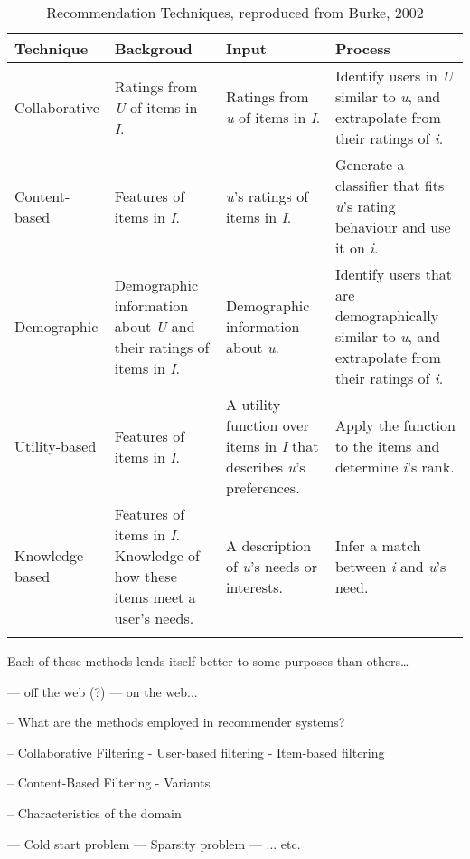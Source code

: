 \begin{table}[ht]
    \caption{Recommendation Techniques, reproduced from Burke, 2002 \cite{Burke02}}
    \centering
    \begin{tabular}{|p{2.5cm}|p{3.5cm}|p{3.5cm}|p{3.5cm}|}
        Technique & Backgroud & Input & Process
        \\\hline
        Collaborative & Ratings from \textit{U} of items in \textit{I}. & Ratings from \textit{u} of items in \textit{I}. & Identify users in \textit{U} similar to \textit{u}, and extrapolate from their ratings of \textit{i}. \\
        Content-based & Features of items in \textit{I}. & \textit{u}'s ratings of items in \textit{I}. & Generate a classifier that fits \textit{u}'s rating behaviour and use it on \textit{i}. \\ 
        Demographic & Demographic information about \textit{U} and their ratings of items in \textit{I}. & Demographic information about \textit{u}. & Identify users that are demographically similar to \textit{u}, and extrapolate from their ratings of \textit{i}. \\
        Utility-based & Features of items in \textit{I}. & A utility function over items in \textit{I} that describes \textit{u}'s preferences. & Apply the function to the items and determine \textit{i}'s rank. \\
        Knowledge-based & Features of items in \textit{I}. Knowledge of how these items meet a user's needs. & A description of \textit{u}'s needs or interests. & Infer a match between \textit{i} and \textit{u}'s need. \\
        \\\hline
    \end{tabular}
    \label{table:burke02}
\end{table}

Each of these methods lends itself better to some purposes than others\ldots






--- off the web (?)
--- on the web...

-- What are the methods employed in recommender systems?

-- Collaborative Filtering
  - User-based filtering
  - Item-based filtering

-- Content-Based Filtering
  - Variants

-- Characteristics of the domain

--- Cold start problem
--- Sparsity problem
--- ... etc.

